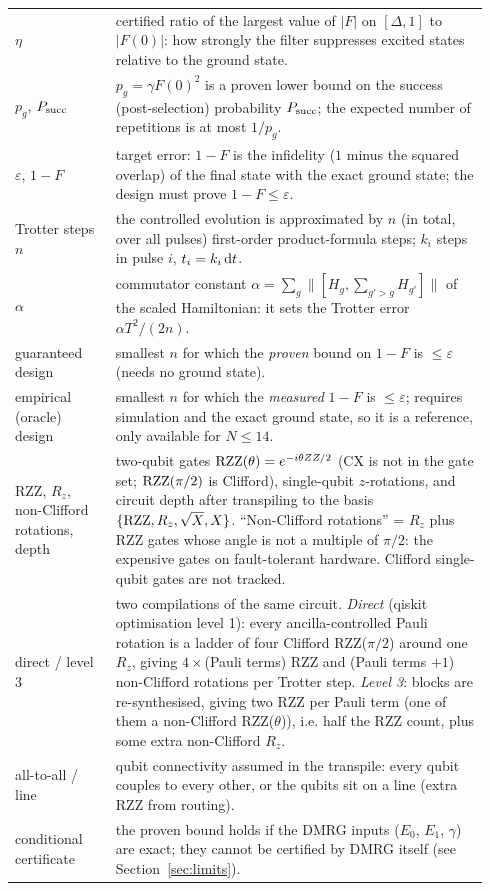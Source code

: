 \documentclass[11pt]{article}
\begin{document}
\begin{longtable}{p{0.2\linewidth}p{0.74\linewidth}}
$\eta$ & certified ratio of the largest value of $|F|$ on $[\Delta,1]$ to $|F(0)|$: how strongly the filter suppresses excited states relative to the ground state. \\
$p_g$, $P_{\rm succ}$ & $p_g=\gamma F(0)^2$ is a proven lower bound on the success (post-selection) probability $P_{\rm succ}$; the expected number of repetitions is at most $1/p_g$. \\
$\varepsilon$, $1-F$ & target error: $1-F$ is the infidelity ($1$ minus the squared overlap) of the final state with the exact ground state; the design must prove $1-F\leq\varepsilon$. \\
Trotter steps $n$ & the controlled evolution is approximated by $n$ (in total, over all pulses) first-order product-formula steps; $k_i$ steps in pulse $i$, $t_i=k_i\,{\rm d}t$. \\
$\alpha$ & commutator constant $\alpha=\sum_g\|[H_g,\sum_{g'>g}H_{g'}]\|$ of the scaled Hamiltonian: it sets the Trotter error $\alpha T^2/(2n)$. \\
guaranteed design & smallest $n$ for which the \emph{proven} bound on $1-F$ is $\leq\varepsilon$ (needs no ground state). \\
empirical (oracle) design & smallest $n$ for which the \emph{measured} $1-F$ is $\leq\varepsilon$; requires simulation and the exact ground state, so it is a reference, only available for $N\leq14$. \\
RZZ, $R_z$, non-Clifford rotations, depth & two-qubit gates ${\rm RZZ}(\theta)=e^{-i\theta ZZ/2}$ (CX is not in the gate set; ${\rm RZZ}(\pi/2)$ is Clifford), single-qubit $z$-rotations, and circuit depth after transpiling to the basis $\{{\rm RZZ},R_z,\sqrt{X},X\}$. ``Non-Clifford rotations'' = $R_z$ plus RZZ gates whose angle is not a multiple of $\pi/2$: the expensive gates on fault-tolerant hardware. Clifford single-qubit gates are not tracked. \\
direct / level 3 & two compilations of the same circuit. \emph{Direct} (qiskit optimisation level 1): every ancilla-controlled Pauli rotation is a ladder of four Clifford RZZ($\pi/2$) around one $R_z$, giving $4\times$(Pauli terms) RZZ and (Pauli terms $+1$) non-Clifford rotations per Trotter step. \emph{Level 3}: blocks are re-synthesised, giving two RZZ per Pauli term (one of them a non-Clifford RZZ($\theta$)), i.e. half the RZZ count, plus some extra non-Clifford $R_z$. \\
all-to-all / line & qubit connectivity assumed in the transpile: every qubit couples to every other, or the qubits sit on a line (extra RZZ from routing). \\
conditional certificate & the proven bound holds if the DMRG inputs ($E_0$, $E_1$, $\gamma$) are exact; they cannot be certified by DMRG itself (see Section~\ref{sec:limits}). \\
\bottomrule
\end{longtable}
\end{document}
